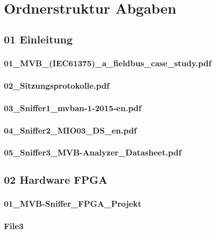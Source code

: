 

\chapter{Ordnerstruktur Abgaben} %
\label{ApendixB} %

\section{01 Einleitung}
\label{app:Odner1}
\subsection{01\_MVB\_(IEC61375)\_a\_fieldbus\_case\_study.pdf}
\label{app:File11}
\subsection{02\_Sitzungsprotokolle.pdf}
\label{app:File12}
\subsection{03\_Sniffer1\_mvban-1-2015-en.pdf}
\label{app:File13}
\subsection{04\_Sniffer2\_MIO03\_DS\_en.pdf}
\label{app:File14}
\subsection{05\_Sniffer3\_MVB-Analyzer\_Datasheet.pdf}
\label{app:File15}

\section{02 Hardware FPGA}
\label{app:Odner3}
\subsection{01\_MVB-Sniffer\_FPGA\_Projekt}
\label{app:File31}
\subsection{File3}
\label{app:File32}

